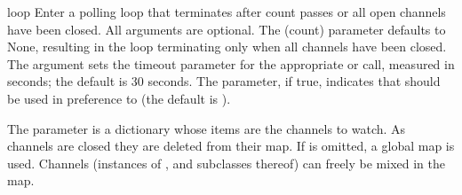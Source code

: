 \begin{funcdesc}{loop}{}
  Enter a polling loop that terminates after count passes or all open
  channels have been closed.  All arguments are optional.  The \var(count)
  parameter defaults to None, resulting in the loop terminating only
  when all channels have been closed.  The  argument sets the
  timeout parameter for the appropriate  or
   call, measured in seconds; the default is 30 seconds.
  The  parameter, if true, indicates that 
  should be used in preference to  (the default is
  ).  

  The  parameter is a dictionary whose items are
  the channels to watch.  As channels are closed they are deleted from their
  map.  If  is omitted, a global map is used.
  Channels (instances of , 
  and subclasses thereof) can freely be mixed in the map.
\end{funcdesc}

